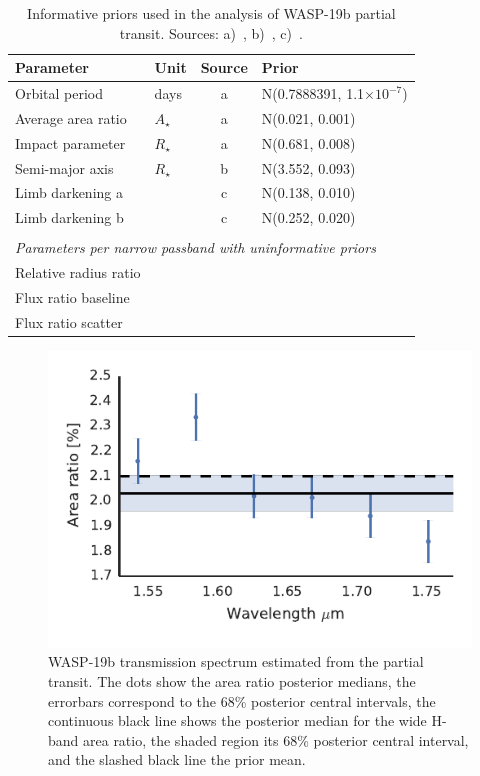 \documentclass[useAMS,usenatbib]{mn2e}
\begin{document}
\begin{table}
\begin{tabularx}{\columnwidth}{@{\extracolsep\fill}llcl}
\toprule
Parameter & Unit & Source & Prior\\
\midrule
Orbital period & days & a & N(0.7888391, 1.1$\times 10^{-7}$)\\
Average area ratio & $A_\star$ & a & N(0.021, 0.001)\\
Impact parameter & $R_\star$ & a & N(0.681, 0.008) \\ 
Semi-major axis & $R_\star$ & b & N(3.552, 0.093) \\
Limb darkening a & & c & N(0.138, 0.010) \\
Limb darkening b & & c & N(0.252, 0.020) \\
\\
\multicolumn{4}{l}{\textit{Parameters per narrow passband with uninformative priors}}\\
Relative radius ratio & & & \\
Flux ratio baseline   & & & \\
Flux ratio scatter    & & & \\
\bottomrule
 \end{tabularx}
\caption{Informative priors used in the analysis of WASP-19b partial transit. Sources: a)~\citet{Bean2013}, 
b)~\citet{Hellier2011a}, c)~\citet{Claret2013}.}
\label{table:wasp_19b_priors}
\end{table}

\begin{figure}
 \centering
 \includegraphics[width=\columnwidth]{wasp_19_h_transmission_spectrum_a.pdf}
 \caption{WASP-19b transmission spectrum estimated from the partial transit. The dots show the area ratio posterior 
medians, the errorbars correspond to the 68\% posterior central intervals, the continuous black line shows the
posterior 
median for the wide H-band area ratio, the shaded region its 68\% posterior central interval, and the slashed black
line 
the prior mean.}
 \label{fig:wasp_19b_h_transmission_spectrum}
\end{figure}
\end{document}
